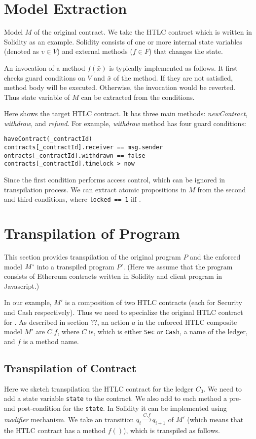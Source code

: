 \documentclass[english]{jsarticle}
\begin{document}
\section{Model Extraction}
Model $M$ of the original contract. We take the HTLC contract which is written in Solidity as an example.
Solidity consists of one or more internal state variables (denoted as $v\in V$) and external methods ($f \in F$) that changes the state.

An invocation of a method $f(\bar{x})$ is typically implemented as follows.
It first checks guard conditions on $V$ and $\bar{x}$ of the method.
If they are not satisfied, method body will be executed. Otherwise, the invocation would be reverted.
Thus state variable of $M$ can be extracted from the conditions.

Here shows the target HTLC contract. It has three main methods: \textit{newContract}, \textit{withdraw}, and \textit{refund}.
For example, \textit{withdraw} method has four guard conditions:

\begin{verbatim}
haveContract(_contractId)
contracts[_contractId].receiver == msg.sender
ontracts[_contractId].withdrawn == false
contracts[_contractId].timelock > now
\end{verbatim}

Since the first condition performs access control, which can be ignored in transpilation process.
We can extract atomic propositions in $M$ from the second and third conditions,
where \texttt{locked == 1} iff .

\section{Transpilation of Program}
This section provides transpilation of the original program $P$ and the enforced model $M`$ into a transpiled program $P'$.
(Here we assume that the program consists of Ethereum contracts written in Solidity and client program in Javascript.)

In our example, $M'$ is a composition of two HTLC contracts (each for Security and Cash respectively).
Thus we need to specialize the original HTLC contract for .
As described in section ??, an action $a$ in the enforced HTLC composite model $M'$ are $C.f$, where $C$ is, which is either \texttt{Sec} or \texttt{Cash}, a name of the ledger, and $f$ is a method name.

\subsection{Transpilation of Contract}
Here we sketch transpilation the HTLC contract for the ledger $C_0$. 
We need to add a state variable \texttt{state} to the contract.
We also add to each method a pre- and post-condition for the \texttt{state}.
In Solidity it can be implemented using \textit{modifier} mechanism.
We take an transition $q_i \xrightarrow{C.f} q_{i+1}$ of $M'$ (which means that the HTLC contract has a method $f()$), which is transpiled as follows.
\end{document}
